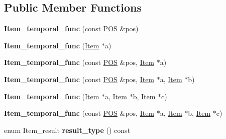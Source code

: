 \subsection*{Public Member Functions}
\begin{DoxyCompactItemize}
\item 
\mbox{\label{classItem__temporal__func_a51ff2fe0545382cba0989484bf785c70}} 
{\bfseries Item\+\_\+temporal\+\_\+func} (const \mbox{\hyperlink{structYYLTYPE}{P\+OS}} \&pos)
\item 
\mbox{\label{classItem__temporal__func_a5ac3a90dc4d46b104d29dd859fa57398}} 
{\bfseries Item\+\_\+temporal\+\_\+func} (\mbox{\hyperlink{classItem}{Item}} $\ast$a)
\item 
\mbox{\label{classItem__temporal__func_a45ea95e77323438bb5399b43e6df9b64}} 
{\bfseries Item\+\_\+temporal\+\_\+func} (const \mbox{\hyperlink{structYYLTYPE}{P\+OS}} \&pos, \mbox{\hyperlink{classItem}{Item}} $\ast$a)
\item 
\mbox{\label{classItem__temporal__func_a47f6548e768b4c9dc06958bca6b28b52}} 
{\bfseries Item\+\_\+temporal\+\_\+func} (const \mbox{\hyperlink{structYYLTYPE}{P\+OS}} \&pos, \mbox{\hyperlink{classItem}{Item}} $\ast$a, \mbox{\hyperlink{classItem}{Item}} $\ast$b)
\item 
\mbox{\label{classItem__temporal__func_a76f5e9b1391861de4be707502ba12f90}} 
{\bfseries Item\+\_\+temporal\+\_\+func} (\mbox{\hyperlink{classItem}{Item}} $\ast$a, \mbox{\hyperlink{classItem}{Item}} $\ast$b, \mbox{\hyperlink{classItem}{Item}} $\ast$c)
\item 
\mbox{\label{classItem__temporal__func_aa508d5c82c13f67a1538f2d22df98013}} 
{\bfseries Item\+\_\+temporal\+\_\+func} (const \mbox{\hyperlink{structYYLTYPE}{P\+OS}} \&pos, \mbox{\hyperlink{classItem}{Item}} $\ast$a, \mbox{\hyperlink{classItem}{Item}} $\ast$b, \mbox{\hyperlink{classItem}{Item}} $\ast$c)
\item 
\mbox{\label{classItem__temporal__func_a5df3dc9b7ae962a941372bf59faec924}} 
enum Item\+\_\+result {\bfseries result\+\_\+type} () const

\end{DoxyCompactItemize}
